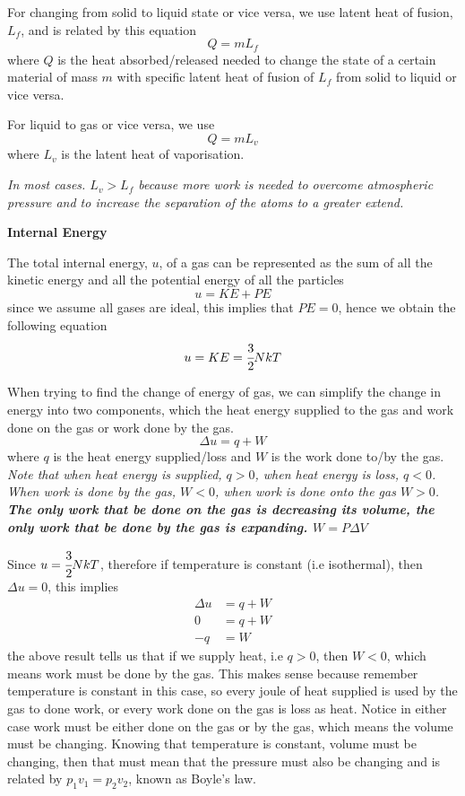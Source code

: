 \documentclass{article}
\begin{document}
For changing from solid to liquid state or vice versa, we use latent heat of fusion, $L_f$, and is related by this equation
$$Q=mL_f$$
where $Q$ is the heat absorbed/released needed to change the state of a certain material of mass $m$ with specific latent heat of fusion of $L_f$ from solid to liquid or vice versa.

For liquid to gas or vice versa, we use 
$$Q=mL_v$$
where $L_v$ is the latent heat of vaporisation.

\textit{In most cases. $L_v > L_f$ because more work is needed to overcome atmospheric pressure and to increase the separation of the atoms to a greater extend.}

\begin{flushleft}
 \textbf{Internal Energy}
\end{flushleft}

The total internal energy, $u$, of a gas can be represented as the sum of all the kinetic energy and all the potential energy of all the particles
$$u=KE+PE$$
since we assume all gases are ideal, this implies that $PE=0$, hence we obtain the following equation
$$u=KE=\cfrac{3}{2}NkT$$

When trying to find the change of energy of gas, we can simplify the change in energy into two components, which the heat energy supplied to the gas and work done on the gas or work done by the gas.
$$\Delta u=q+W$$
where $q$ is the heat energy supplied/loss and $W$ is the work done to/by the gas. \textit{Note that when heat energy is supplied, $q>0$, when heat energy is loss, $q<0$. When work is done by the gas, $W<0$, when work is done onto the gas $W>0$. \textbf{The only work that be done on the gas is decreasing its volume, the only work that be done by the gas is expanding. $W=P\Delta V$}}

Since $u=\cfrac{3}{2}NkT$, therefore if temperature is constant (i.e isothermal), then $\Delta u=0$, this implies 
\begin{align*}
    \Delta u&=q+W \\ 
    0&=q+W\\ 
    -q&=W
\end{align*}
the above result tells us that if we supply heat, i.e $q>0$, then $W<0$, which means work must be done by the gas. This makes sense because remember temperature is constant in this case, so every joule of heat supplied is used by the gas to done work, or every work done on the gas is loss as heat. Notice in either case work must be either done on the gas or by the gas, which means the volume must be changing. Knowing that temperature is constant, volume must be changing, then that must mean that the pressure must also be changing and is related by $p_1v_1=p_2v_2$, known as Boyle's law.
\end{document}
